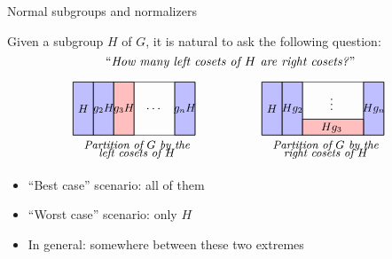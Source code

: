 \documentclass[8pt, handout]{beamer}
\newcommand{\Pause}{\pause}      %
\begin{document}
\begin{frame}{Normal subgroups and normalizers}

  Given a subgroup $H$ of $G$, it is natural to ask the following
  question:
  \[
  \text{``\emph{How many left cosets of $H$ are right cosets?}''}
  \]

  \vspace{-2mm}\Pause
  
  \[
  \begin{tikzpicture}[scale=.75,xscale=1.1]
    \tikzstyle{every node}=[font=\small]
    \begin{scope}[shift={(0,0)}]
      \draw[thin,fill=boxBlue] (0,0) rectangle (.7,2);
      \draw[thin,fill=boxBlue] (.7,0) rectangle (1.4,2);
      \draw[thin,fill=boxRed] (1.4,0) rectangle (2.1,2);
      \draw[thin,fill=boxBlue] (3.5,0) rectangle (4.2,2);
      \draw[thin] (0,0) rectangle (4.2,2);
      \draw[thin] (.7,0) -- (.7,2);
      \node at (.35,1) {$H$};
      \node at (1.05,1) {$g_2H$};
      \draw[thin] (1.4,0) -- (1.4,2);
      \node at (1.75,1) {$g_3H$};
      \draw[thin] (2.1,0) -- (2.1,2);
      \draw[thin] (3.5,0) -- (3.5,2);
      \node at (3.85,1) {$g_nH$};
      \node at (2.8,1) {\normalsize $\dots$};
      \node at (2.2,-.4) {\emph{Partition of $G$ by the}};
      \node at (2.2,-.7) {\emph{left cosets of $H$}};
    \end{scope}
    \begin{scope}[shift={(6.5,0)}]
      \draw[thin,fill=boxBlue] (0,0) rectangle (.7,2);
      \draw[thin,fill=boxBlue] (.7,0) rectangle (1.4,2);
      \draw[thin,fill=boxBlue] (3.5,0) rectangle (4.2,2);
      \draw[thin,fill=boxRed] (1.4,0) rectangle (3.5,.6);
      \draw[thin] (0,0) rectangle (4.2,2);
      \draw[thin] (.7,0) -- (.7,2);
      \node at (.35,1) {$H$};
      \node at (1.05,1) {$Hg_2$};
      \draw[thin] (1.4,0) -- (1.4,2);
      \node at (2.4,.28) {$Hg_3$};
      \draw[thin] (1.4,.6) -- (3.5,.6);
      \draw[thin] (3.5,0) -- (3.5,2);
      \node at (3.85,1) {$Hg_n$};
      \node at (2.4,1.3) {\normalsize $\vdots$};
      \node at (2.2,-.4) {\emph{Partition of $G$ by the}};
      \node at (2.2,-.7) {\emph{right cosets of $H$}};
    \end{scope}
  \end{tikzpicture}
  \]

  \vspace{-2mm}\Pause
  
  \begin{itemize}
  \item ``Best case'' scenario: all of them \Pause
  \item ``Worst case'' scenario: only $H$ \Pause
  \item In general: somewhere between these two extremes
  \end{itemize}
  

\end{frame}
\end{document}

